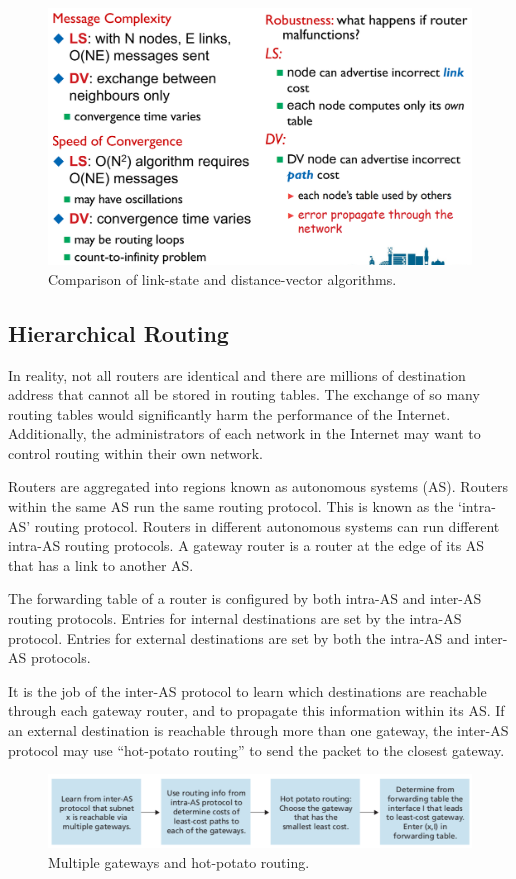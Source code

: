\begin{figure}[htp]
  \centering
  \includegraphics[width=12cm]{unit-19/figures/routing-algorithms.png}
  \caption*{Comparison of link-state and distance-vector algorithms.}
\end{figure}

\subsection{Hierarchical Routing}

In reality, not all routers are identical and there are millions of destination address that cannot all be stored in routing tables.
The exchange of so many routing tables would significantly harm the performance of the Internet.
Additionally, the administrators of each network in the Internet may want to control routing within their own network.

Routers are aggregated into regions known as autonomous systems (AS).
Routers within the same AS run the same routing protocol.
This is known as the `intra-AS' routing protocol.
Routers in different autonomous systems can run different intra-AS routing protocols.
A gateway router is a router at the edge of its AS that has a link to another AS\@.

The forwarding table of a router is configured by both intra-AS and inter-AS routing protocols.
Entries for internal destinations are set by the intra-AS protocol.
Entries for external destinations are set by both the intra-AS and inter-AS protocols.

It is the job of the inter-AS protocol to learn which destinations are reachable through each gateway router, and to propagate this information within its AS\@.
If an external destination is reachable through more than one gateway, the inter-AS protocol may use ``hot-potato routing'' to send the packet to the closest gateway.

\begin{figure}
  \centering
  \includegraphics[width=15cm]{unit-19/figures/hot-potato.png}
  \caption*{Multiple gateways and hot-potato routing.}
\end{figure}

